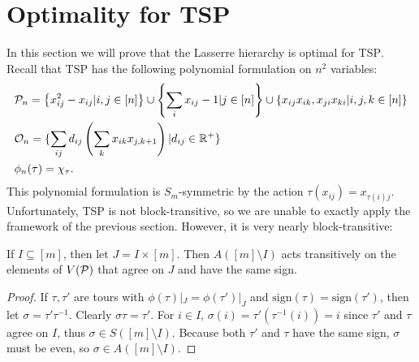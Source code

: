\section{Optimality for \textsc{TSP}}
In this section we will prove that the Lasserre hierarchy is optimal for \textsc{TSP}. 
Recall that \textsc{TSP} has the following polynomial formulation on $n^2$ variables:
\begin{align*}
&\mathcal P_n = \left\{x_{ij}^2 - x_{ij} | i,j \in [n]\right\} \cup \left\{\sum_i x_{ij} - 1 | j \in [n]\right\} \cup \left\{x_{ij}x_{ik}, x_{ji}x_{ki} | i,j,k \in [n]\right\} \\
&\mathcal O_n = \{\sum_{ij} d_{ij}\left(\sum_{k} x_{ik}x_{j,k+1}\right) | d_{ij} \in \mathbb R^+\} \\
&\phi_n(\tau) = \chi_{\tau}.
\end{align*}
This polynomial formulation is $S_m$-symmetric by the action $\tau(x_{ij}) = x_{\tau(i)j}$. Unfortunately, \textsc{TSP} is not block-transitive, so we are unable to exactly apply the framework of the previous section. However, it is very nearly block-transitive: 
\begin{lemma}\label{lem:tsp-blocktransitive}
If $I \subseteq [m]$, then let $J = I \times [m]$. Then $A([m] \setminus I)$ acts transitively on the elements of $V(\mathcal P)$ that agree on $J$ and have the same sign.
\end{lemma}
\begin{proof}
If $\tau,\tau'$ are tours with $\phi(\tau)|_J = \phi(\tau')|_J$ and $\text{sign}(\tau) = \text{sign}(\tau')$, then let $\sigma = \tau'\tau^{-1}$. Clearly $\sigma\tau = \tau'$. For $i \in I$, $\sigma(i) = \tau'(\tau^{-1}(i)) = i$ since $\tau'$ and $\tau$ agree on $I$, thus $\sigma \in S([m]\setminus I)$. Because both $\tau'$ and $\tau$ have the same sign, $\sigma$ must be even, so $\sigma \in A([m]\setminus I)$.
\end{proof}

